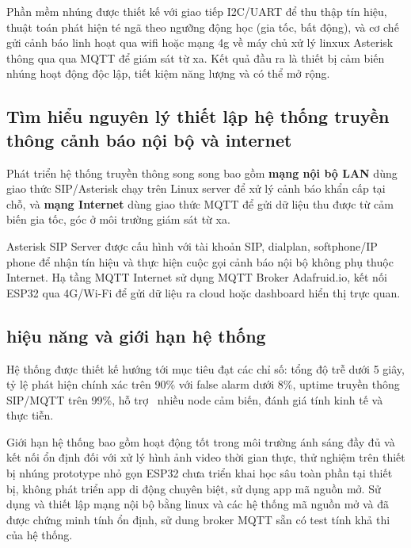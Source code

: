 Phần mềm nhúng được thiết kế với giao tiếp I2C/UART để thu thập tín hiệu, thuật toán phát hiện té ngã theo ngưỡng động học (gia tốc, bất động), và cơ chế gửi cảnh báo linh hoạt qua wifi hoặc mạng 4g về máy chủ xử lý linxux Asterisk thông qua qua MQTT để giám sát từ xa. Kết quả đầu ra là thiết bị cảm biến nhúng hoạt động độc lập, tiết kiệm năng lượng và có thể mở rộng.

\subsection{Tìm hiểu nguyên lý thiết lập hệ thống truyền thông cảnh báo nội bộ và internet}

Phát triển hệ thống truyền thông song song bao gồm \textbf{mạng nội bộ LAN} dùng giao thức SIP/Asterisk chạy trên Linux server để xử lý cảnh báo khẩn cấp tại chỗ, và \textbf{mạng Internet} dùng giao thức MQTT để gửi dữ liệu thu được từ cảm biến gia tốc, góc ở môi trường giám sát từ xa.

Asterisk SIP Server được cấu hình với tài khoản SIP, dialplan, softphone/IP phone để nhận tín hiệu và thực hiện cuộc gọi cảnh báo nội bộ không phụ thuộc Internet. Hạ tầng MQTT Internet sử dụng MQTT Broker Adafruid.io, kết nối ESP32 qua 4G/Wi-Fi để gửi dữ liệu ra cloud hoặc dashboard hiển thị trực quan.


\subsection{hiệu năng và giới hạn hệ thống}

Hệ thống được thiết kế hướng tới mục tiêu đạt các chỉ số: tổng độ trễ dưới 5 giây, tỷ lệ phát hiện chính xác trên 90\% với false alarm dưới 8\%, uptime truyền thông SIP/MQTT trên 99\%, hỗ trợ  nhiều node cảm biến, đánh giá tính kinh tế và thực tiễn.

Giới hạn hệ thống bao gồm hoạt động tốt trong môi trường ánh sáng đầy đủ và kết nối ổn định đối với xử lý hình ảnh video thời gian thực, thử nghiệm trên thiết bị nhúng prototype nhỏ gọn ESP32 chưa triển khai học sâu toàn phần tại thiết bị, không phát triển app di động chuyên biệt, sử dụng app mã nguồn mở. Sử dụng và thiết lập mạng nội bộ bằng linux và các hệ thống mã nguồn mở và đã được chứng minh tính ổn định, sử dung broker MQTT sẵn có test tính khả thi của hệ thống.
